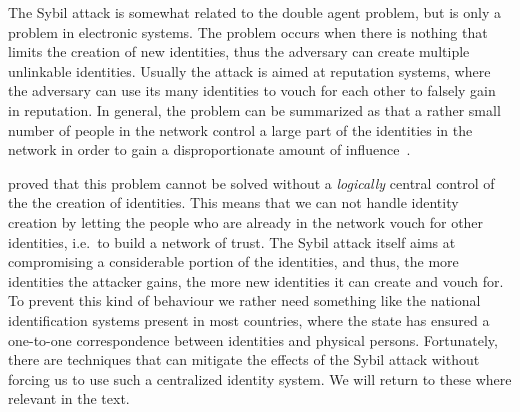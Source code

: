 The Sybil attack is somewhat related to the double agent problem, but is only 
a problem in electronic systems.
The problem occurs when there is nothing that limits the creation of new 
identities, thus the adversary can create multiple unlinkable identities.
Usually the attack is aimed at reputation systems, where the adversary can use 
its many identities to vouch for each other to falsely gain in reputation.
In general, the problem can be summarized as that a rather small number of 
people in the network control a large part of the identities in the network in 
order to gain a disproportionate amount of influence~\cite{SybilAttack}.

 proved that this problem cannot be solved without 
a \emph{logically} central control of the the creation of identities.
This means that we can not handle identity creation by letting the people who 
are already in the network vouch for other identities, i.e.\ to build a network 
of trust.
The Sybil attack itself aims at compromising a considerable portion of the 
identities, and thus, the more identities the attacker gains, the more new 
identities it can create and vouch for.
To prevent this kind of behaviour we rather need something like the national 
identification systems present in most countries, where the state has ensured 
a one-to-one correspondence between identities and physical persons.
Fortunately, there are techniques that can mitigate the effects of the Sybil 
attack without forcing us to use such a centralized identity system.
We will return to these where relevant in the text.



